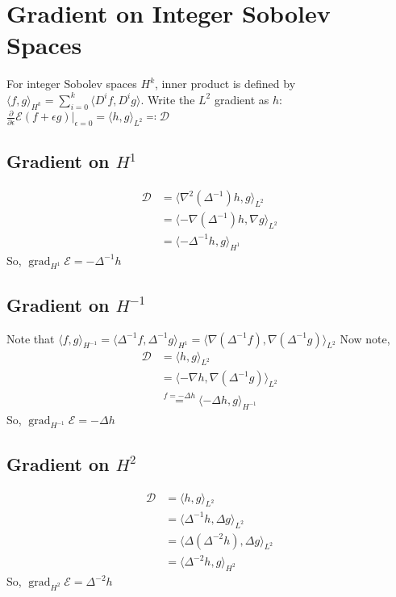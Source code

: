 \documentclass[a4paper]{article}
\theoremstyle{definition}
\newcommand{\inner}[2]{\langle #1, #2 \rangle}
\DeclareMathOperator{\grad}{grad}
\begin{document}
\section{Gradient on Integer Sobolev Spaces}
For integer Sobolev spaces $H^k$, inner product is defined by $\inner{f}{g}_{H^k} = \sum_{i=0}^{k} \inner{D^i f}{D^i g}$.
Write the $L^2$ gradient as $h$: $\frac{\partial}{\partial \epsilon} \mathcal{E} (f+\epsilon g) |_{\epsilon = 0} = \inner{h}{g}_{L^2} \eqqcolon \mathcal{D}$
\subsection{Gradient on $H^1$}
\begin{align}
    \mathcal{D} &= \inner{\nabla^2 (\Delta^{-1})h}{g}_{L^2} \\
    &= \inner{-\nabla \left( \Delta^{-1} \right)h }{\nabla g}_{L^2} \\
    &= \inner{- \Delta^{-1} h}{g}_{H^1}
\end{align}
So, $\grad_{H^1} \mathcal{E} = -\Delta^{-1} h$

\subsection{Gradient on $H^{-1}$}
Note that $\inner{f}{g}_{H^{-1}} = \inner{\Delta^{-1} f}{\Delta^{-1} g}_{H^1} = \inner{\nabla \left( \Delta^{-1} f \right)}{\nabla \left( \Delta^{-1} g \right)}_{L^2}$
Now note,
\begin{align}
    \mathcal{D} &= \inner{h}{g}_{L^2} \\
    &= \inner{-\nabla h}{\nabla \left( \Delta^{-1} g \right)}_{L^2} \\
    &\stackrel{f=-\Delta h}{=} \inner{-\Delta h}{g}_{H^{-1}}
\end{align}
So, $\grad_{H^{-1}} \mathcal{E} = -\Delta h$

\subsection{Gradient on $H^2$}
\begin{align}
    \mathcal{D} &= \inner{h}{g}_{L^2} \\
    &= \inner{\Delta^{-1} h}{\Delta g}_{L^2} \\
    &= \inner{\Delta \left( \Delta^{-2} h \right)}{\Delta g}_{L^2} \\
    &= \inner{\Delta^{-2} h}{g}_{H^2}
\end{align}
So, $\grad_{H^2} \mathcal{E} = \Delta^{-2} h$
\end{document}
